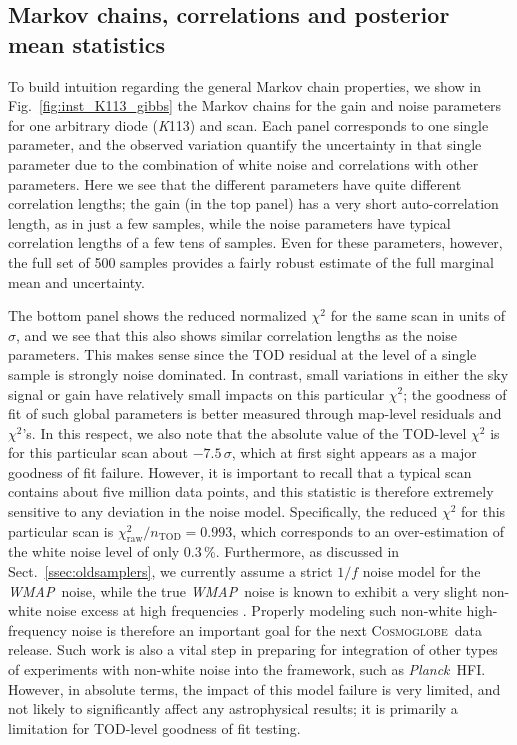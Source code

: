 \documentclass[twocolumn]{../../common/aa}
\def\WMAP{\emph{WMAP}}
\def\Planck{\emph{Planck}}
\newcommand{\cosmoglobe}{\textsc{Cosmoglobe}}
\newcommand{\K}[0]{\textit K}
\begin{document}
\subsection{Markov chains, correlations and posterior mean statistics}
\label{sec:summary_stats}

To build intuition regarding the general Markov chain properties, we show in Fig.~\ref{fig:inst_K113_gibbs} the Markov chains for the gain and noise parameters for one arbitrary diode (\K113) and scan. Each panel corresponds to one single parameter, and the observed variation quantify the uncertainty in that single parameter due to the combination of white noise and correlations with other parameters. Here we see that the different parameters have quite different correlation lengths; the gain (in the top panel) has a very short auto-correlation length, as in just a few samples, while the noise parameters have typical correlation lengths of a few tens of samples. Even for these parameters, however, the full set of 500 samples provides a fairly robust estimate of the full marginal mean and uncertainty.

The bottom panel shows the reduced normalized $\chi^2$ for the same scan in units of $\sigma$, and we see that this also shows similar correlation lengths as the noise parameters. This makes sense since the TOD residual at the level of a single sample is strongly noise dominated. In contrast, small variations in either the sky signal or gain have relatively small impacts on this particular $\chi^2$; the goodness of fit of such global parameters is better measured through map-level residuals and $\chi^2$'s. In this respect, we also note that the absolute value of the TOD-level $\chi^2$ is for this particular scan about $-7.5\,\sigma$, which at first sight appears as a major goodness of fit failure. However, it is important to recall that a typical scan contains about five million data points, and this statistic is therefore extremely sensitive to any deviation in the noise model. Specifically, the reduced $\chi^2$ for this particular scan is $\chi_{\mathrm{raw}}^2/n_{\mathrm{TOD}}=0.993$, which corresponds to an over-estimation of the white noise level of only 0.3\,\%. Furthermore, as discussed in Sect.~\ref{ssec:oldsamplers}, we currently assume a strict $1/f$ noise model for the \WMAP\ noise, while the true \WMAP\ noise is known to exhibit a very slight non-white noise excess at high frequencies \citep{bp17}. Properly modeling such non-white high-frequency noise is therefore an important goal for the next \cosmoglobe\ data release.  Such work is also a vital step in preparing for integration of other types of experiments with non-white noise into the framework, such as \Planck\ HFI. However, in absolute terms, the impact of this model failure is very limited, and not likely to significantly affect any astrophysical results; it is primarily a limitation for TOD-level goodness of fit testing.
\end{document}
